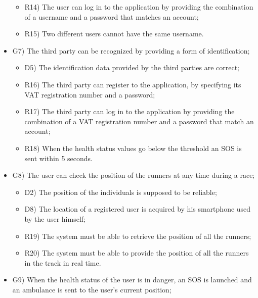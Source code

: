 \documentclass{article}
\begin{document}
\begin{legal}
\begin{legal}
\begin{legal}
\begin{itemize}
{\begin{itemize}
					\item R14) The user can log in to the application by providing the combination of a username and a password that matches an account;\\
					\item R15) Two different users cannot have the same username.\\
					\end{itemize}
				}
				\item G7) The third party can be recognized by providing a form of identification; \\
				{\normalfont
					\begin{itemize}
					\item D5) The identification data provided by the third parties are correct;\\
	 				\item R16) The third party can register to the application, by specifying its VAT registration number and a password;\\
					\item R17) The third party can log in to the application by providing the combination of a VAT registration number and a password that match an account;\\
					\item R18) When the health status values go below the threshold an SOS is sent within 5 seconds.\\
					\end{itemize}
				}
				\item G8) The user can check the position of the runners at any time during a race;\\
				{\normalfont
					\begin{itemize}
					\item D2) The position of the individuals is supposed to be reliable;\\
					\item D8) The location of a registered user is acquired by his smartphone used by the user himself;\\
	 				\item R19) The system must be able to retrieve the position of all the runners;\\
					\item R20) The system must be able to provide the position of all the runners in the track in real time.\\
					\end{itemize}
				}
				\item G9) When the health status of the user is in danger, an SOS is launched and an ambulance is sent to the user’s current position;\\

\end{itemize}
\end{legal}
\end{legal}
\end{legal}
\end{document}
